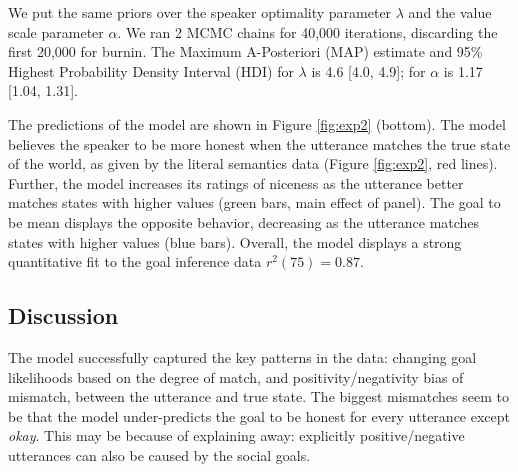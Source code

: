 \documentclass[10pt,letterpaper]{article}
\begin{document}
We put the same priors over the speaker optimality parameter $\lambda$ and the value scale parameter $\alpha$.
We ran 2 MCMC chains for 40,000 iterations, discarding the first 20,000 for burnin.
The Maximum A-Posteriori (MAP) estimate and 95\% Highest Probability Density Interval (HDI) for $\lambda$ is 4.6 [4.0, 4.9]; for $\alpha$ is 1.17 [1.04, 1.31].%




The predictions of the model are shown in Figure \ref{fig:exp2} (bottom).
The model believes the speaker to be more honest when the utterance matches the true state of the world, as given by the literal semantics data (Figure \ref{fig:exp2}, red lines). 
Further, the model increases its ratings of niceness as the utterance better matches states with higher values (green bars, main effect of panel).
The goal to be mean displays the opposite behavior, decreasing as the utterance matches states with higher values (blue bars).
Overall, the model displays a strong quantitative fit to the goal inference data $r^2(75) = 0.87$.


\subsection{Discussion}

The model successfully captured the key patterns in the data: 
changing goal likelihoods based on the degree of match, and positivity/negativity bias of mismatch, between the utterance and true state. 
The biggest mismatches seem to be that the model under-predicts the goal to be honest for every utterance except \emph{okay}.
This may be because of explaining away: explicitly positive/negative utterances can also be caused by the social goals. 
\end{document}

